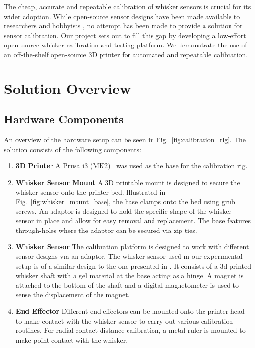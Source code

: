 \documentclass[runningheads]{llncs}
\begin{document}
The cheap, accurate and repeatable calibration of whisker sensors is crucial for its wider adoption. While open-source sensor designs have been made available to researchers and hobbyists \cite{Paparas_Ratatouille-Whiskers_Ratatouille-Whisker_Ratatouille_Whisker_2024}, no attempt has been made to provide a solution for sensor calibration. Our project sets out to fill this gap by developing a low-effort open-source whisker calibration and testing platform. We demonstrate the use of an off-the-shelf open-source 3D printer for automated and repeatable calibration.

\section{Solution Overview}

\subsection{Hardware Components}

An overview of the hardware setup can be seen in Fig.~\ref{fig:calibration_rig}. The solution consists of the following components:

\begin{enumerate}
    \item \textbf{3D Printer} A Prusa i3 (MK2)~\cite{OriginalPrusaI3} was used as the base for the calibration rig.

    \item \textbf{Whisker Sensor Mount} A 3D printable mount is designed to secure the whisker sensor onto the printer bed. Illustrated in Fig.~\ref{fig:whisker_mount_base}, the base clamps onto the bed using grub screws. An adaptor is designed to hold the specific shape of the whisker sensor in place and allow for easy removal and replacement. The base features through-holes where the adaptor can be secured via zip ties.

    \item \textbf{Whisker Sensor} The calibration platform is designed to work with different sensor designs via an adaptor. The whisker sensor used in our experimental setup is of a similar design to the one presented in \cite{Paparas_Ratatouille-Whiskers_Ratatouille-Whisker_Ratatouille_Whisker_2024}. It consists of a 3d printed whisker shaft with a gel material at the base acting as a hinge. A magnet is attached to the bottom of the shaft and a digital magnetometer is used to sense the displacement of the magnet.
    
    \item \textbf{End Effector} Different end effectors can be mounted onto the printer head to make contact with the whisker sensor to carry out various calibration routines. For radial contact distance calibration, a metal ruler is mounted to make point contact with the whisker.
\end{enumerate}
\end{document}
